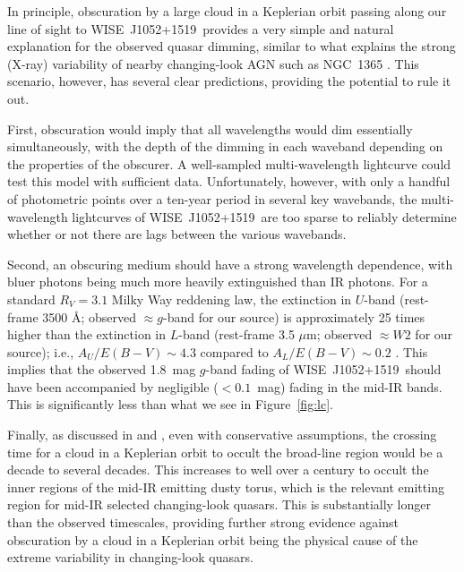 \documentclass[iop]{emulateapj}
\def\ie{{i.e.}}
\def\eg{{e.g.}}
\def\qso{WISE~J1052+1519}
\begin{document}
In principle, obscuration by a large cloud in a Keplerian orbit
passing along our line of sight to \qso\ provides a very simple and
natural explanation for the observed quasar dimming, similar to
what explains the strong (X-ray) variability of nearby changing-look
AGN such as NGC~1365 \citep[\eg,][]{Walton:14}.  This scenario,
however, has several clear predictions, providing the potential to
rule it out.

First, obscuration would imply that all wavelengths would dim
essentially simultaneously, with the depth of the dimming in each
waveband depending on the properties of the obscurer.  A well-sampled
multi-wavelength lightcurve could test this model with sufficient data.
Unfortunately, however, with only a handful of photometric points
over a ten-year period in several key wavebands, the multi-wavelength
lightcurves of \qso\ are too sparse to reliably determine whether
or not there are lags between the various wavebands.

Second, an obscuring medium should have a strong wavelength dependence,
with bluer photons being much more heavily extinguished than IR photons.
For a standard $R_V = 3.1$ \citet{Fitzpatrick:99} Milky Way reddening
law, the extinction in $U$-band (rest-frame 3500 \AA; observed
$\approx g$-band for our source) is approximately 25 times higher
than the extinction in $L$-band (rest-frame 3.5 $\mu$m; observed
$\approx W2$ for our source); \ie, $A_U/E(B-V) \sim 4.3$ compared
to $A_L/E(B-V) \sim 0.2$ \citep{Schlafly:11}.   This implies that
the observed 1.8~mag $g$-band fading of \qso\ should have been
accompanied by negligible ($< 0.1$~mag) fading in the mid-IR bands.
This is significantly less than what we see in Figure~\ref{fig:lc}.

Finally, as discussed in \citet{LaMassa:15} and \citet{Sheng:17},
even with conservative assumptions, the crossing time for a cloud
in a Keplerian orbit to occult the broad-line region would be a
decade to several decades.  This increases to well over a century
to occult the inner regions of the mid-IR emitting dusty torus,
which is the relevant emitting region for mid-IR selected changing-look
quasars.  This is substantially longer than the observed timescales,
providing further strong evidence against obscuration by a cloud
in a Keplerian orbit being the physical cause of the extreme
variability in changing-look quasars.
\end{document}

